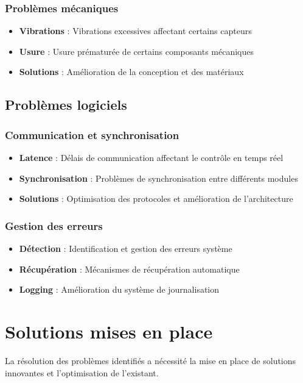 {\subsubsection{Problèmes mécaniques}
\begin{itemize}
    \item \textbf{Vibrations} : Vibrations excessives affectant certains capteurs
    \item \textbf{Usure} : Usure prématurée de certains composants mécaniques
    \item \textbf{Solutions} : Amélioration de la conception et des matériaux
\end{itemize}

\subsection{Problèmes logiciels}
\subsubsection{Communication et synchronisation}
\begin{itemize}
    \item \textbf{Latence} : Délais de communication affectant le contrôle en temps réel
    \item \textbf{Synchronisation} : Problèmes de synchronisation entre différents modules
    \item \textbf{Solutions} : Optimisation des protocoles et amélioration de l'architecture
\end{itemize}

\subsubsection{Gestion des erreurs}
\begin{itemize}
    \item \textbf{Détection} : Identification et gestion des erreurs système
    \item \textbf{Récupération} : Mécanismes de récupération automatique
    \item \textbf{Logging} : Amélioration du système de journalisation
\end{itemize}

\section{Solutions mises en place}
La résolution des problèmes identifiés a nécessité la mise en place de solutions innovantes et l'optimisation de l'existant.

}
